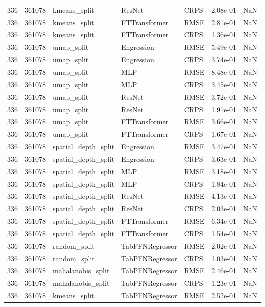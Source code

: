 \begin{tabular}{rrlllrr}
336 & 361078 & kmeans\_split & ResNet & CRPS & 2.08e-01 & NaN \\
336 & 361078 & kmeans\_split & FTTransformer & RMSE & 2.81e-01 & NaN \\
336 & 361078 & kmeans\_split & FTTransformer & CRPS & 1.36e-01 & NaN \\
336 & 361078 & umap\_split & Engression & RMSE & 5.49e-01 & NaN \\
336 & 361078 & umap\_split & Engression & CRPS & 3.74e-01 & NaN \\
336 & 361078 & umap\_split & MLP & RMSE & 8.48e-01 & NaN \\
336 & 361078 & umap\_split & MLP & CRPS & 3.45e-01 & NaN \\
336 & 361078 & umap\_split & ResNet & RMSE & 3.72e-01 & NaN \\
336 & 361078 & umap\_split & ResNet & CRPS & 1.91e-01 & NaN \\
336 & 361078 & umap\_split & FTTransformer & RMSE & 3.66e-01 & NaN \\
336 & 361078 & umap\_split & FTTransformer & CRPS & 1.67e-01 & NaN \\
336 & 361078 & spatial\_depth\_split & Engression & RMSE & 3.47e-01 & NaN \\
336 & 361078 & spatial\_depth\_split & Engression & CRPS & 3.63e-01 & NaN \\
336 & 361078 & spatial\_depth\_split & MLP & RMSE & 3.18e-01 & NaN \\
336 & 361078 & spatial\_depth\_split & MLP & CRPS & 1.84e-01 & NaN \\
336 & 361078 & spatial\_depth\_split & ResNet & RMSE & 4.13e-01 & NaN \\
336 & 361078 & spatial\_depth\_split & ResNet & CRPS & 2.03e-01 & NaN \\
336 & 361078 & spatial\_depth\_split & FTTransformer & RMSE & 6.34e-01 & NaN \\
336 & 361078 & spatial\_depth\_split & FTTransformer & CRPS & 1.54e-01 & NaN \\
336 & 361078 & random\_split & TabPFNRegressor & RMSE & 2.02e-01 & NaN \\
336 & 361078 & random\_split & TabPFNRegressor & CRPS & 1.03e-01 & NaN \\
336 & 361078 & mahalanobis\_split & TabPFNRegressor & RMSE & 2.46e-01 & NaN \\
336 & 361078 & mahalanobis\_split & TabPFNRegressor & CRPS & 1.23e-01 & NaN \\
336 & 361078 & kmeans\_split & TabPFNRegressor & RMSE & 2.52e-01 & NaN \\

\end{tabular}
